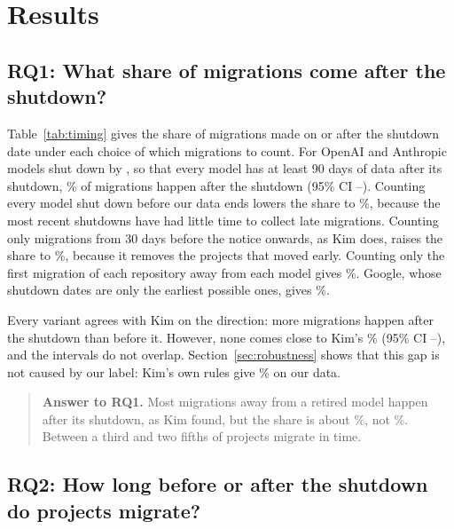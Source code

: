 \section{Results}\label{sec:results}

\subsection{RQ1: What share of migrations come after the shutdown?}

Table~\ref{tab:timing} gives the share of migrations made on or after the shutdown date under each choice of which migrations to count. For OpenAI and Anthropic models shut down by \RetiredBy, so that every model has at least 90 days of data after its shutdown, \AfterLate\% of \AfterLateTotal{} migrations happen after the shutdown (95\% CI \AfterLateLow--\AfterLateHigh). Counting every model shut down before our data ends lowers the share to \AfterAll\%, because the most recent shutdowns have had little time to collect late migrations. Counting only migrations from 30 days before the notice onwards, as Kim does, raises the share to \AfterWindow\%, because it removes the projects that moved early. Counting only the first migration of each repository away from each model gives \AfterFirst\%. Google, whose shutdown dates are only the earliest possible ones, gives \AfterGoogle\%.

Every variant agrees with Kim on the direction: more migrations happen after the shutdown than before it. However, none comes close to Kim's \KimAfterShutdown\% (95\% CI \KimAfterShutdownLow--\KimAfterShutdownHigh), and the intervals do not overlap. Section~\ref{sec:robustness} shows that this gap is not caused by our label: Kim's own rules give \AfterKimLabel\% on our data.


\begin{quote}
\textbf{Answer to RQ1.} Most migrations away from a retired model happen after its shutdown, as Kim found, but the share is about \AfterLate\%, not \KimAfterShutdown\%. Between a third and two fifths of projects migrate in time.
\end{quote}

\subsection{RQ2: How long before or after the shutdown do projects migrate?}


